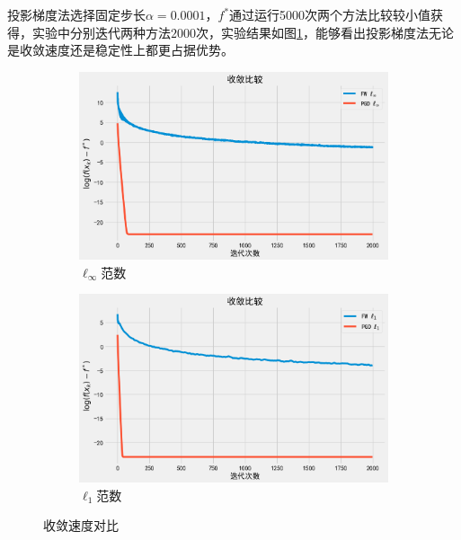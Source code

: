 \documentclass{homework}
\begin{document}
\begin{sol}
投影梯度法选择固定步长$\alpha = 0.0001$，$f^*$通过运行5000次两个方法比较较小值获得，实验中分别迭代两种方法$2000$次，实验结果如图\ref{1}，能够看出投影梯度法无论是收敛速度还是稳定性上都更占据优势。
\begin{figure}[h]
    \centering
    \begin{subfigure}[t]{0.48\textwidth}
        \centering
        \includegraphics[width=\linewidth]{1.png}
        \caption{$\ell_\infty$范数}
    \end{subfigure}
    \hfill %
    \begin{subfigure}[t]{0.48\textwidth}
        \centering
        \includegraphics[width=\linewidth]{2.png}
        \caption{$\ell_1$范数}
    \end{subfigure}
    \caption{收敛速度对比}\label{1}
\end{figure}

\end{sol}

\question
\end{document}
